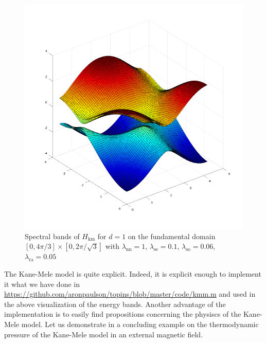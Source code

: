 \begin{enumerate}
\begin{figure}[H]
\includegraphics[scale=0.4]{graphics/specrash.png}
\caption{Spectral bands of $H_{\textrm{km}}$ for $d = 1$ on the fundamental domain $[0,4\pi/3] \times [0,2\pi/\sqrt{3}]$ with $\lambda_{\textrm{nn}} = 1$, $\lambda_{\textrm{se}} = 0.1$, $\lambda_{\textrm{so}} = 0.06$, $\lambda_{\textrm{ra}} = 0.05$}
\label{fig:specrash}
\end{figure}
\end{enumerate}
The Kane-Mele model is quite explicit. Indeed, it is explicit enough to implement it what we have done in \href{https://github.com/aronpaulson/topins/blob/master/code/kmm.m}{https://github.com/aronpaulson/topins/blob/master/code/kmm.m} and used in the above visualization of the energy bands. Another advantage of the implementation is to easily find propositions concerning the physiscs of the Kane-Mele model. Let us demonstrate in a concluding example on the thermodynamic pressure of the Kane-Mele model in an external magnetic field.
\\
